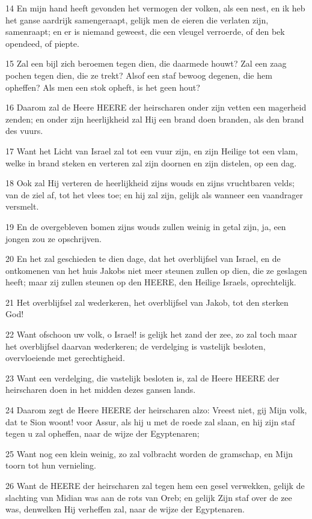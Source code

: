\par 14 En mijn hand heeft gevonden het vermogen der volken, als een nest, en ik heb het ganse aardrijk samengeraapt, gelijk men de eieren die verlaten zijn, samenraapt; en er is niemand geweest, die een vleugel verroerde, of den bek opendeed, of piepte.
\par 15 Zal een bijl zich beroemen tegen dien, die daarmede houwt? Zal een zaag pochen tegen dien, die ze trekt? Alsof een staf bewoog degenen, die hem opheffen? Als men een stok opheft, is het geen hout?
\par 16 Daarom zal de Heere HEERE der heirscharen onder zijn vetten een magerheid zenden; en onder zijn heerlijkheid zal Hij een brand doen branden, als den brand des vuurs.
\par 17 Want het Licht van Israel zal tot een vuur zijn, en zijn Heilige tot een vlam, welke in brand steken en verteren zal zijn doornen en zijn distelen, op een dag.
\par 18 Ook zal Hij verteren de heerlijkheid zijns wouds en zijns vruchtbaren velds; van de ziel af, tot het vlees toe; en hij zal zijn, gelijk als wanneer een vaandrager versmelt.
\par 19 En de overgebleven bomen zijns wouds zullen weinig in getal zijn, ja, een jongen zou ze opschrijven.
\par 20 En het zal geschieden te dien dage, dat het overblijfsel van Israel, en de ontkomenen van het huis Jakobs niet meer steunen zullen op dien, die ze geslagen heeft; maar zij zullen steunen op den HEERE, den Heilige Israels, oprechtelijk.
\par 21 Het overblijfsel zal wederkeren, het overblijfsel van Jakob, tot den sterken God!
\par 22 Want ofschoon uw volk, o Israel! is gelijk het zand der zee, zo zal toch maar het overblijfsel daarvan wederkeren; de verdelging is vastelijk besloten, overvloeiende met gerechtigheid.
\par 23 Want een verdelging, die vastelijk besloten is, zal de Heere HEERE der heirscharen doen in het midden dezes gansen lands.
\par 24 Daarom zegt de Heere HEERE der heirscharen alzo: Vreest niet, gij Mijn volk, dat te Sion woont! voor Assur, als hij u met de roede zal slaan, en hij zijn staf tegen u zal opheffen, naar de wijze der Egyptenaren;
\par 25 Want nog een klein weinig, zo zal volbracht worden de gramschap, en Mijn toorn tot hun vernieling.
\par 26 Want de HEERE der heirscharen zal tegen hem een gesel verwekken, gelijk de slachting van Midian was aan de rots van Oreb; en gelijk Zijn staf over de zee was, denwelken Hij verheffen zal, naar de wijze der Egyptenaren.

